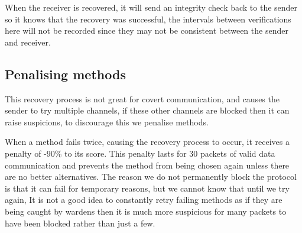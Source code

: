 When the receiver is recovered, it will send an integrity check back to the sender so it knows that the recovery was successful, the intervals between verifications here will not be recorded since they may not be consistent between the sender and receiver.

\subsection{Penalising methods}
\label{sec:penalising}

This recovery process is not great for covert communication, and causes the sender to try multiple channels, if these other channels are blocked then it can raise suspicions, to discourage this we penalise methods.

When a method fails twice, causing the recovery process to occur, it receives a penalty of -90\% to its score. This penalty lasts for 30 packets of valid data communication and prevents the method from being chosen again unless there are no better alternatives. The reason we do not permanently block the protocol is that it can fail for temporary reasons, but we cannot know that until we try again, It is not a good idea to constantly retry failing methods as if they are being caught by wardens then it is much more suspicious for many packets to have been blocked rather than just a few.
